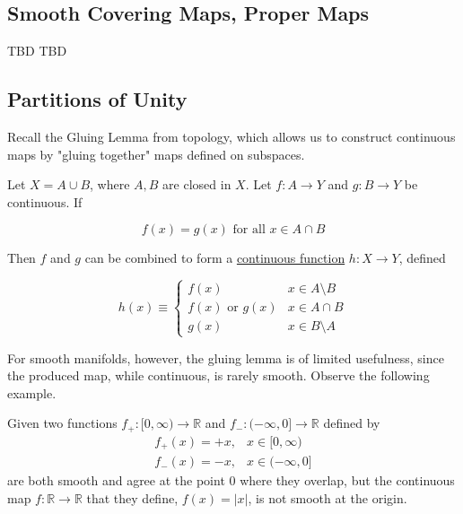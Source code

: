 \documentclass{article}
\newcounter{example}[section]
\begin{document}
  \subsection{Smooth Covering Maps, Proper Maps}

    TBD
    TBD

  \subsection{Partitions of Unity}

    Recall the Gluing Lemma from topology, which allows us to construct continuous maps by "gluing together" maps defined on subspaces. 

    \begin{lemma}
      \label{thm:pasting-lemma-gluing-lemma}
      Let $X = A \cup B$, where $A, B$ are closed in $X$. Let $f: A \to Y$ and $g: B \to Y$ be continuous. If 

        \begin{equation}
          f(x) = g(x) \text{ for all } x \in A \cap B
        \end{equation}

      Then $f$ and $g$ can be combined to form a \hyperref[pst-def:continuous_func]{continuous function} $h: X \to Y$, defined

        \begin{equation}
          h(x) \equiv \begin{cases}
                      f(x) & x \in A \setminus B \\
                      f(x) \text{ or } g(x) & x \in A \cap B \\
                      g(x) & x \in B \setminus A
                  \end{cases}
        \end{equation}
    \end{lemma}

    For smooth manifolds, however, the gluing lemma is of limited usefulness, since the produced map, while continuous, is rarely smooth. Observe the following example. 

    \begin{example}
      \label{ex:gluing-one-sided-functions}
      Given two functions $f_+: [0, \infty) \to \mathbb{R}$ and $f_-: (-\infty, 0] \to \mathbb{R}$ defined by 
      \begin{align*}
        f_+(x) = + x, & x \in [0, \infty) \\
        f_-(x) = - x, & x \in (-\infty, 0]
      \end{align*}
      are both smooth and agree at the point $0$ where they overlap, but the continuous map $f: \mathbb{R} \to \mathbb{R}$ that they define, $f(x) = |x|$, is not smooth at the origin. 
    \end{example}
\end{document}
